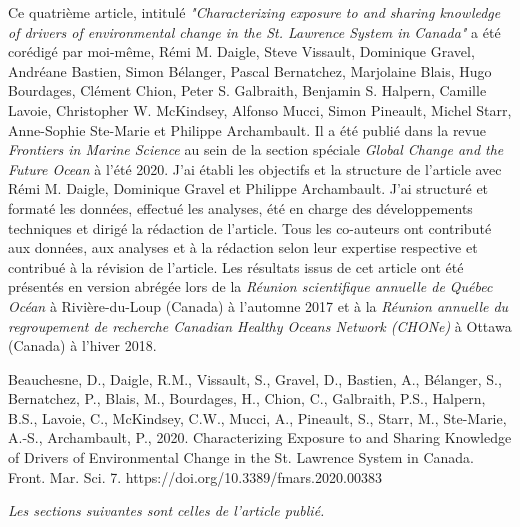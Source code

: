 Ce quatrième article, intitulé \textit{"Characterizing exposure to and sharing knowledge of drivers of environmental change in the St. Lawrence System in Canada"} a été corédigé par moi-même, Rémi M. Daigle, Steve Vissault, Dominique Gravel, Andréane Bastien, Simon Bélanger, Pascal Bernatchez, Marjolaine Blais, Hugo Bourdages, Clément Chion, Peter S. Galbraith, Benjamin S. Halpern, Camille Lavoie, Christopher W. McKindsey, Alfonso Mucci, Simon Pineault, Michel Starr, Anne-Sophie Ste-Marie et Philippe Archambault. Il a été publié dans la revue \textit{Frontiers in Marine Science} au sein de la section spéciale \textit{Global Change and the Future Ocean} à l'été 2020. J'ai établi les objectifs et la structure de l'article avec Rémi M. Daigle, Dominique Gravel et Philippe Archambault. J'ai structuré et formaté les données, effectué les analyses, été en charge des développements techniques et dirigé la rédaction de l'article. Tous les co-auteurs ont contributé aux données, aux analyses et à la rédaction selon leur expertise respective et contribué à la révision de l'article. Les résultats issus de cet article ont été présentés en version abrégée lors de la \textit{Réunion scientifique annuelle de Québec Océan} à Rivière-du-Loup (Canada) à l'automne 2017 et à la \textit{Réunion annuelle du regroupement de recherche Canadian Healthy Oceans Network (CHONe)} à Ottawa (Canada) à l'hiver 2018. \linebreak[4]


\begin{singlespace}
  Beauchesne, D., Daigle, R.M., Vissault, S., Gravel, D., Bastien, A., Bélanger, S., Bernatchez, P., Blais, M., Bourdages, H., Chion, C., Galbraith, P.S., Halpern, B.S., Lavoie, C., McKindsey, C.W., Mucci, A., Pineault, S., Starr, M., Ste-Marie, A.-S., Archambault, P., 2020. Characterizing Exposure to and Sharing Knowledge of Drivers of Environmental Change in the St. Lawrence System in Canada. Front. Mar. Sci. 7. https://doi.org/10.3389/fmars.2020.00383
\end{singlespace}

\textit{Les sections suivantes sont celles de l'article publié.}

